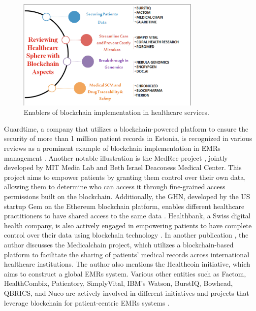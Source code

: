  \begin{figure}[H]
 \centering
  \includegraphics[width=0.8\textwidth]{enablers of blockchain.png}
  \caption{Enablers of blockchain implementation in healthcare services.}
  \label{fig:Enablers of blockchain implementation in healthcare services}
\end{figure}

Guardtime, a company that utilizes a blockchain-powered platform to ensure the security of more than 1 million patient records in Estonia, is recognized in various reviews as a prominent example of blockchain implementation in \ac{EMRs} management \cite{angraal2017blockchain}\cite{mettler2016blockchain}. Another notable illustration is the MedRec project \cite{azaria2016medrec}, jointly developed by \ac{MIT} Media Lab and Beth Israel Deaconess Medical Center. This project aims to empower patients by granting them control over their own data, allowing them to determine who can access it through fine-grained access permissions built on the blockchain. Additionally, the \ac{GHN}, developed by the US startup Gem on the Ethereum blockchain platform, enables different healthcare practitioners to have shared access to the same data \cite{azaria2016medrec}. Healthbank, a Swiss digital health company, is also actively engaged in empowering patients to have complete control over their data using blockchain technology \cite{azaria2016medrec}. In another publication \cite{engelhardt2017hitching}, the author discusses the Medicalchain project, which utilizes a blockchain-based platform to facilitate the sharing of patients' medical records across international healthcare institutions. The author also mentions the Healthcoin initiative, which aims to construct a global \ac{EMRs} system. Various other entities such as Factom, HealthCombix, Patientory, SimplyVital, IBM's Watson, BurstIQ, Bowhead, QBRICS, and Nuco are actively involved in different initiatives and projects that leverage blockchain for patient-centric \ac{EMRs} systems \cite{engelhardt2017hitching}.



